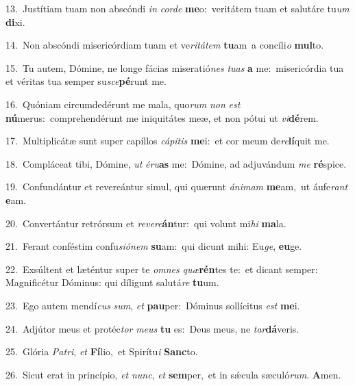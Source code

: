 {\numbfont\textcolor{\numbcolor}{13.}}~Justítiam tuam non abscóndi \textit{in} \textit{cor}\-\textit{de} \textbf{me}\-o:~\star veritátem tuam et salutáre tu\textit{um} \textbf{di}\-xi.\par
{\numbfont\textcolor{\numbcolor}{14.}}~Non abscóndi misericórdiam tuam et ve\-\textit{ri}\-\textit{tá}\textit{tem} \textbf{tu}\-am~\star a concíli\textit{o} \textbf{mul}\-to.\par
{\numbfont\textcolor{\numbcolor}{15.}}~Tu autem, Dómine, ne longe fácias miseratió\textit{nes} \textit{tu}\-\textit{as} \textbf{a} me:~\star misericórdia tua et véritas tua semper su\-\textit{sce}\-\textbf{pé}runt me.\par
{\numbfont\textcolor{\numbcolor}{16.}}~Quóniam circumdedérunt me mala, quo\textit{rum} \textit{non} \textit{est} \textbf{nú}\-merus:~\star comprehendérunt me iniquitátes meæ, et non pótui ut \textit{vi}\-\textbf{dé}rem.\par
{\numbfont\textcolor{\numbcolor}{17.}}~Multiplicátæ sunt super capíllos \textit{cá}\-\textit{pi}\textit{tis} \textbf{me}\-i:~\star et cor meum de\-\textit{re}\-\textbf{lí}quit me.\par
{\numbfont\textcolor{\numbcolor}{18.}}~Compláceat tibi, Dómine, \textit{ut} \textit{é}\-\textit{ru}\textbf{as} me:~\star Dómine, ad adjuvándum \textit{me} \textbf{ré}\-spice.\par
{\numbfont\textcolor{\numbcolor}{19.}}~Confundántur et revereántur simul, qui quærunt \textit{á}\-\textit{ni}\textit{mam} \textbf{me}\-am,~\star ut áufe\textit{rant} \textbf{e}\-am.\par
{\numbfont\textcolor{\numbcolor}{20.}}~Convertántur retrórsum et \textit{re}\-\textit{ve}\textit{re}\textbf{án}tur:~\star qui volunt mi\textit{hi} \textbf{ma}\-la.\par
{\numbfont\textcolor{\numbcolor}{21.}}~Ferant conféstim confu\-\textit{si}\-\textit{ó}\textit{nem} \textbf{su}\-am:~\star qui dicunt mihi: Eu\-\textit{ge}\-, \textbf{eu}\-ge.\par
{\numbfont\textcolor{\numbcolor}{22.}}~Exsúltent et læténtur super te \textit{om}\-\textit{nes} \textit{quæ}\-\textbf{rén}tes te:~\star et dicant semper: Magnificétur Dóminus: qui díligunt salutá\textit{re} \textbf{tu}\-um.\par
{\numbfont\textcolor{\numbcolor}{23.}}~Ego autem mendí\textit{cus} \textit{sum}\-, \textit{et} \textbf{pau}\-per:~\star Dóminus sollícitus \textit{est} \textbf{me}\-i.\par
{\numbfont\textcolor{\numbcolor}{24.}}~Adjútor meus et protéc\textit{tor} \textit{me}\-\textit{us} \textbf{tu} es:~\star Deus meus, ne \textit{tar}\-\textbf{dá}veris.\par
{\numbfont\textcolor{\numbcolor}{25.}}~Glória \textit{Pa}\-\textit{tri}, \textit{et} \textbf{Fí}\-lio,~\star et Spirítu\textit{i} \textbf{Sanc}\-to.\par
{\numbfont\textcolor{\numbcolor}{26.}}~Sicut erat in princípio, \textit{et} \textit{nunc}\-, \textit{et} \textbf{sem}\-per,~\star et in sǽcula sæculó\-\textit{rum}\-. \textbf{A}\-men.\par
